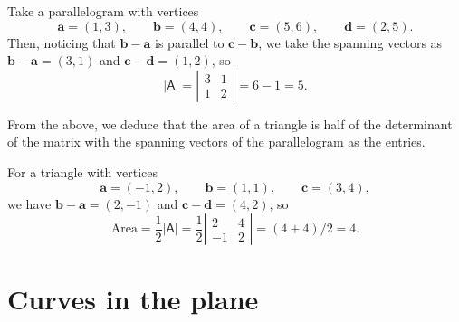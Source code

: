 \documentclass[letter-paper]{tufte-book}
\newenvironment{example}[1][Example]{\begin{trivlist}
\item[\hskip \labelsep {\bfseries #1}]}{\end{trivlist}}
\newcommand{\ab}{\boldsymbol{a}}
\newcommand{\bb}{\boldsymbol{b}}
\newcommand{\cb}{\boldsymbol{c}}
\newcommand{\db}{\boldsymbol{d}}
\begin{document}
\begin{example}
	Take a parallelogram with vertices
	\begin{equation*}
		\ab=(1,3),\qquad\bb=(4,4),\qquad \cb=(5,6),\qquad\db=(2,5).
	\end{equation*}
	Then, noticing that $\bb-\ab$ is parallel to $\cb-\bb$, we take the spanning
	vectors as $\bb-\ab=(3,1)$ and $\cb-\db=(1,2)$, so
	\begin{equation*}
		|\mathsf{A}|=\left|\begin{matrix}3 & 1\\ 1 & 2\end{matrix}\right|=6-1=5.
	\end{equation*}
\end{example}

From the above, we deduce that the area of a triangle is half of the
determinant of the matrix with the spanning vectors of the parallelogram as the
entries.

\begin{example}
	For a triangle with vertices
	\begin{equation*}
		\ab=(-1,2),\qquad\bb=(1,1),\qquad\cb=(3,4),
	\end{equation*}
	we have $\bb-\ab=(2,-1)$ and $\cb-\db=(4,2)$, so
	\begin{equation*}
		\mbox{Area}=\frac{1}{2}|\mathsf{A}|
		=\frac{1}{2}\left|\begin{matrix}2 & 4\\ -1 & 2\end{matrix}\right|
		=(4+4)/2=4.
	\end{equation*}
\end{example}


\section{Curves in the plane}
\end{document}
